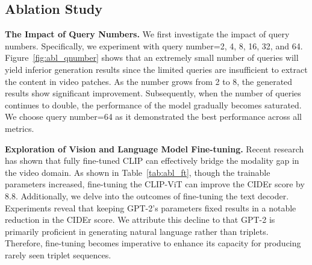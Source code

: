 \documentclass[letterpaper]{article}
\begin{document}
\subsection{Ablation Study}
\noindent \textbf{The Impact of Query Numbers. }
We first investigate the impact of query numbers. 
Specifically, we experiment with query number=2, 4, 8, 16, 32, and 64. 
Figure~\ref{fig:abl_qnumber} shows that an extremely small number of queries will yield inferior generation results since the limited queries are insufficient to extract the content in video patches. 
 As the number grows from 2 to 8, the generated results show significant improvement.
 Subsequently, when the number of queries continues to double, the performance of the model gradually becomes saturated. We choose query number=64 as it demonstrated the best performance across all metrics.
 
\noindent \textbf{Exploration of Vision and Language Model Fine-tuning.}
Recent research~\cite{Rasheed2023vificlip} has shown that fully fine-tuned CLIP can effectively bridge the modality gap in the video domain. 
As shown in Table~\ref{tab:abl_ft}, though the trainable parameters increased, fine-tuning the CLIP-ViT can improve the CIDEr score by 8.8.
Additionally, we delve into the outcomes of fine-tuning the text decoder. Experiments reveal that keeping GPT-2's parameters fixed results in a notable reduction in the CIDEr score. We attribute this decline to that GPT-2 is primarily proficient in generating natural language rather than triplets. Therefore, fine-tuning becomes imperative to enhance its capacity for producing rarely seen triplet sequences.
\end{document}
